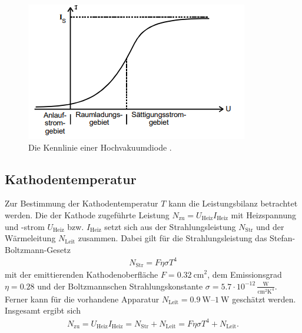 \begin{figure}[H]
    \centering
    \includegraphics[height = 5 cm]{Abbildungen/kennlinie.png}
    \caption{Die Kennlinie einer Hochvakuumdiode \cite[]{man:v504}.}
    \label{fig:kennlinie}
\end{figure}






\subsection{Kathodentemperatur}
Zur Bestimmung der Kathodentemperatur $T$ kann die Leistungsbilanz betrachtet werden.
Die der Kathode zugeführte Leistung $N_\text{zu} = U_\text{Heiz} I_\text{Heiz}$ mit Heizspannung und -strom $U_\text{Heiz}$ bzw. 
$I_\text{Heiz}$ setzt sich aus der Strahlungsleistung $N_\text{Str}$ und der Wärmeleitung $N_\text{Leit}$ zusammen.
Dabei gilt für die Strahlungsleistung das Stefan-Boltzmann-Gesetz
\begin{align}
    N_\text{Str} = F \eta \sigma T^4
\end{align}
mit der emittierenden Kathodenoberfläche $F = \qty{0.32}{\cm}^2$, dem Emissionsgrad $\eta = \num{0.28}$ und der 
Boltzmannschen Strahlungskonstante $\sigma = \num[]{5.7} \cdot 10^{-12} \, \frac{\unit{\watt}}{\unit{\cm}^2\unit{\kelvin}^4}$.
Ferner kann für die vorhandene Apparatur $N_\text{Leit} = \qtyrange{0.9}{1}{\watt}$ geschätzt werden.
Insgesamt ergibt sich 
\begin{align}
    N_\text{zu} = U_\text{Heiz} I_\text{Heiz} = N_\text{Str} + N_\text{Leit} = F \eta \sigma T^4 + N_\text{Leit}.
    \label{eq:leistung}
\end{align}
